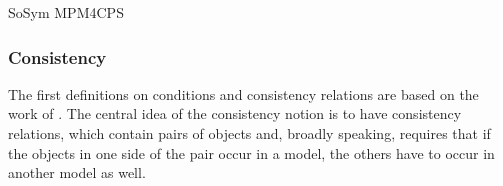 \begin{copiedFrom}{SoSym MPM4CPS}





\subsubsection{Consistency}

The first definitions on conditions and consistency relations are based on the work of \textcite[sec. 2.3.2, 4.1.1]{kramer2017a}.
The central idea of the consistency notion is to have consistency relations, which contain pairs of objects and, broadly speaking, requires that if the objects in one side of the pair occur in a model, the others have to occur in another model as well.


\end{copiedFrom}
